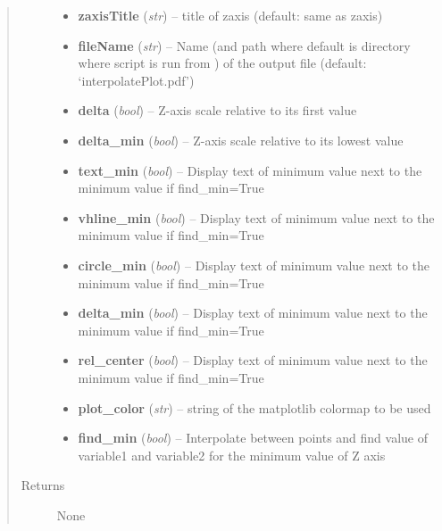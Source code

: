 \documentclass[letterpaper,10pt,english]{sphinxmanual}
\begin{document}
\begin{fulllineitems}
\begin{quote}
\begin{description}
\begin{itemize}
\item {} 
\textbf{zaxisTitle} (\emph{str}) --
title of zaxis (default: same as zaxis)

\item {} 
\textbf{fileName} (\emph{str}) --
Name (and path where default is directory where script is run from ) of the
output file (default: `interpolatePlot.pdf')

\item {} 
\textbf{delta} (\emph{bool}) --
Z-axis scale relative to its first value

\item {} 
\textbf{delta\_min} (\emph{bool}) --
Z-axis scale relative to its lowest value

\item {} 
\textbf{text\_min} (\emph{bool}) --
Display text of minimum value next to the minimum value if find\_min=True

\item {} 
\textbf{vhline\_min} (\emph{bool}) --
Display text of minimum value next to the minimum value if find\_min=True

\item {} 
\textbf{circle\_min} (\emph{bool}) --
Display text of minimum value next to the minimum value if find\_min=True

\item {} 
\textbf{delta\_min} (\emph{bool}) --
Display text of minimum value next to the minimum value if find\_min=True

\item {} 
\textbf{rel\_center} (\emph{bool}) --
Display text of minimum value next to the minimum value if find\_min=True

\item {} 
\textbf{plot\_color} (\emph{str}) --
string of the matplotlib colormap to be used

\item {} 
\textbf{find\_min} (\emph{bool}) --
Interpolate between points and find value of
variable1 and variable2 for the minimum value of Z axis

\end{itemize}

\item[{Returns}] \leavevmode
None

\end{description}\end{quote}

\end{fulllineitems}
\end{document}

